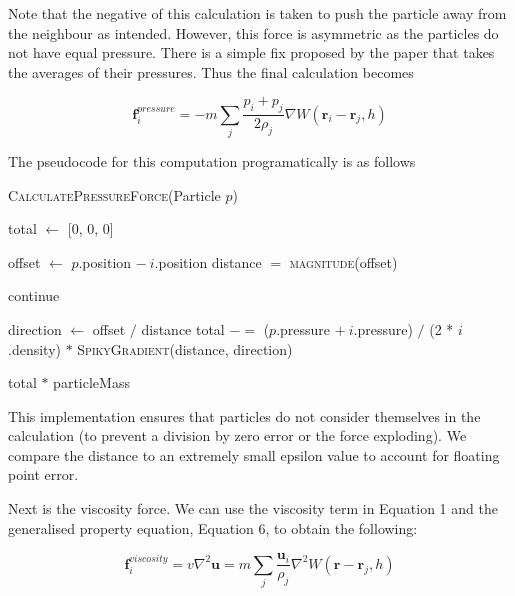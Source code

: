 \documentclass[12pt]{article}
\begin{document}
    Note that the negative of this calculation is taken to push the particle away from the neighbour as intended. However, this force is asymmetric as the particles do not have equal pressure. There is a simple fix proposed by the paper that takes the averages of their pressures. Thus the final calculation becomes

    \begin{equation}
        \textbf{f}^{pressure}_i = -m\sum_{j}\frac{p_i + p_j}{2\rho_j}\nabla{W(\textbf{r}_i - \textbf{r}_j, h)}
    \end{equation}

    The pseudocode for this computation programatically is as follows

    \begin{algorithm}[H]
        \caption{\textsc{CalculatePressureForce}(Particle $p$)}
    
        \begin{algorithmic}[1]
            \State total $\gets$ [0, 0, 0]
            
                \State offset $\gets$ $p$.position $-\ i$.position
                \State distance $=$ \textsc{magnitude}(offset)

                    continue
                \EndIf

                \State direction $\gets$ offset $/$ distance
                \State total $-=$ ($p$.pressure $+\ i$.pressure) $/$ (2 * $i$.density) $*$ \textsc{SpikyGradient}(distance, direction)
            \EndFor

            \Return total $*$ particleMass
        \end{algorithmic}

    \end{algorithm}

    This implementation ensures that particles do not consider themselves in the calculation (to prevent a division by zero error or the force exploding). We compare the distance to an extremely small epsilon value to account for floating point error.
    
    Next is the viscosity force. We can use the viscosity term in Equation 1 and the generalised property equation, Equation 6, to obtain the following:

    \begin{equation}
        \textbf{f}^{viscosity}_{i} = v\nabla^2\textbf{u} = m\sum_{j}{\frac{\textbf{u}_i}{\rho_j}\nabla^2{W(\textbf{r} - \textbf{r}_j, h)}}
    \end{equation}
\end{document}
